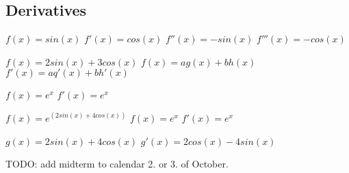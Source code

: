 \documentclass[12pt,a4paper]{article}
\begin{document}
\subsection*{Derivatives}

$f(x)= sin(x)$
$f'(x)= cos(x)$
$f''(x)= -sin(x)$
$f'''(x)= -cos(x)$


$f(x) = 2sin(x) + 3cos(x)$
$f(x) = ag(x) + bh(x)$
$f'(x) = aq'(x) + bh'(x)$

$f(x) = e^x$
$f'(x) = e^x$

$f(x) = e^(2sin(x) + 4cos(x))$
$f(x) = e^x$
$f'(x) = e^x$

$g(x) = 2sin(x) + 4cos(x)$
$g'(x) = 2cos(x) - 4sin(x)$


TODO: add midterm to calendar 2. or 3. of October.
\end{document}
